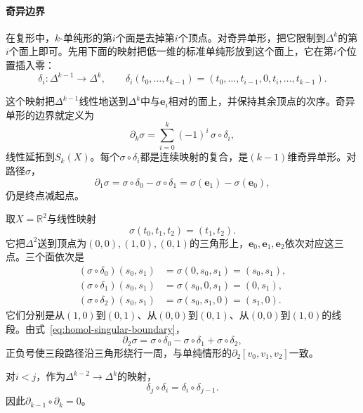 \paragraph{奇异边界}
在复形中，$k$-单纯形的第$i$个面是去掉第$i$个顶点。对奇异单形，把它限制到$\Delta^k$的第$i$个面上即可。先用下面的映射把低一维的标准单纯形放到这个面上，它在第$i$个位置插入零：
\[
 \delta_i:\Delta^{k-1}\to\Delta^k,\qquad
 \delta_i(t_0,\ldots,t_{k-1})=(t_0,\ldots,t_{i-1},0,t_i,\ldots,t_{k-1}).
\]

这个映射把$\Delta^{k-1}$线性地送到$\Delta^k$中与$\bm e_i$相对的面上，并保持其余顶点的次序。奇异单形的边界就定义为
\begin{equation}
 \partial_k\sigma=\sum_{i=0}^k(-1)^i\,\sigma\circ\delta_i,
 \label{eq:homol-singular-boundary}
\end{equation}
线性延拓到$S_k(X)$。每个$\sigma\circ\delta_i$都是连续映射的复合，是$(k-1)$维奇异单形。对路径$\sigma$，
\[
 \partial_1\sigma=\sigma\circ\delta_0-\sigma\circ\delta_1=\sigma(\bm e_1)-\sigma(\bm e_0),
\]
仍是终点减起点。

\begin{example}[平面上一个奇异三角形的边界]
\label{ex:homol-singular-boundary}
取$X=\mathbb R^2$与线性映射
\[
 \sigma(t_0,t_1,t_2)=(t_1,t_2).
\]
它把$\Delta^2$送到顶点为$(0,0),(1,0),(0,1)$的三角形上，$\bm e_0,\bm e_1,\bm e_2$依次对应这三点。三个面依次是
\begin{align*}
 (\sigma\circ\delta_0)(s_0,s_1)&=\sigma(0,s_0,s_1)=(s_0,s_1),\\
 (\sigma\circ\delta_1)(s_0,s_1)&=\sigma(s_0,0,s_1)=(0,s_1),\\
 (\sigma\circ\delta_2)(s_0,s_1)&=\sigma(s_0,s_1,0)=(s_1,0).
\end{align*}
它们分别是从$(1,0)$到$(0,1)$、从$(0,0)$到$(0,1)$、从$(0,0)$到$(1,0)$的线段。由式~\eqref{eq:homol-singular-boundary}，
\[
 \partial_2\sigma=\sigma\circ\delta_0-\sigma\circ\delta_1+\sigma\circ\delta_2,
\]
正负号使三段路径沿三角形绕行一周，与单纯情形的$\partial_2[v_0,v_1,v_2]$一致。
\end{example}

\begin{lemma}[奇异边界的边界为零]
\label{lem:homol-singular-boundary-squared}
对$i<j$，作为$\Delta^{k-2}\to\Delta^k$的映射，
\begin{equation}
 \delta_j\circ\delta_i=\delta_i\circ\delta_{j-1}.
 \label{eq:homol-face-identity}
\end{equation}
因此$\partial_{k-1}\circ\partial_k=0$。
\end{lemma}


